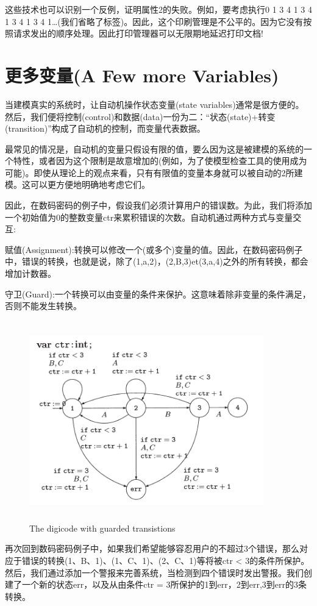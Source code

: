 \documentclass{book}
\begin{document}
    这些技术也可以识别一个反例，证明属性2的失败。例如，要考虑执行0 1 3 4 1 3 4 1 3 4 1 3 4 1…(我们省略了标签)。因此，这个印刷管理是不公平的。因为它没有按照请求发出的顺序处理。因此打印管理器可以无限期地延迟打印文档!

    \section{更多变量(A Few more Variables)}
    当建模真实的系统时，让自动机操作状态变量(state variables)通常是很方便的。然后，我们便将控制(control)和数据(data)一份为二：“状态(state)+转变(transition)”构成了自动机的控制，而变量代表数据。

    最常见的情况是，自动机的变量只假设有限的值，要么因为这是被建模的系统的一个特性，或者因为这个限制是故意增加的(例如，为了使模型检查工具的使用成为可能)。即使从理论上的观点来看，只有有限值的变量本身就可以被自动的2所建模。这可以更方便地明确地考虑它们。

    因此，在数码密码的例子中，假设我们必须计算用户的错误数。为此，我们将添加一个初始值为0的整数变量ctr来累积错误的次数。自动机通过两种方式与变量交互:
    
    赋值(Assignment):转换可以修改一个(或多个)变量的值。因此，在数码密码例子中，错误的转换，也就是说，除了(1,a,2)，(2,B,3)et(3,a,4)之外的所有转换，都会增加计数器。
    
    守卫(Guard):一个转换可以由变量的条件来保护。这意味着除非变量的条件满足，否则不能发生转换。
    
    \begin{figure}
    \centering
    \includegraphics[height=3.4in,width=4.0in]{1_7.png}
    \caption{The digicode with guarded transistions}
    \end{figure}
    再次回到数码密码例子中，如果我们希望能够容忍用户的不超过3个错误，那么对应于错误的转换(1、B、1)、(1、C、1)、(2、C、1)等将被ctr < 3的条件所保护。然后，我们通过添加一个警报来完善系统，当检测到四个错误时发出警报。我们创建了一个新的状态err，以及从由条件ctr = 3所保护的1到err，2到err,3到err的3条转换。
\end{document}

